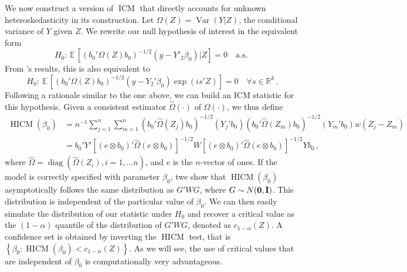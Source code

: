 \documentclass[12pt]{article}
\newcommand{\E}{\operatorname{E}}
\newcommand{\1}{\mathbf{1}}
\newcommand{\HICM}{\operatorname{HICM}}
\newcommand{\Var}{\operatorname{Var}}
\def\E{\mathbb{E}\,}
\newcommand{\ICM}{\operatorname{ICM}}
\DeclareMathOperator{\diag}{diag}
\newcommand{\mI}{\mbox{\bf I}}
\newcommand{\mO}{\mbox{\bf 0}}
\begin{document}
We now construct a version of $\ICM$ that directly accounts for unknown
heteroskedasticity in its construction. Let  $\Omega(Z) = \Var(Y|Z)$,
the conditional variance of $Y$ given $Z$. We rewrite our null
hypothesis of interest in the equivalent form
\begin{equation}
{H}_0: \,  \E\left[ (b_0' \Omega(Z) b_0)^{-1/2}  (y - Y'_{2}\beta_{0}) |Z \right] = 0
\quad \mbox{a.s. }
\label{hyp-hicm}
\end{equation}
From \cite{Bierens82}'s results, this is also equivalent to
\begin{equation}
{H}_{0}: \
\E \left[ (b_0' \Omega(Z) b_0)^{-1/2} \left( y - Y_{2}'\beta_0 \right)
\exp( i s'Z) \right] = 0  \quad \forall s\in\mathbb{R}^k
\, .
\label{icmexp2}
\end{equation}
Following a rationale similar to the one above, we can build an ICM
statistic for this hypothesis.
Given a consistent estimator $\widehat{\Omega}(\cdot)$ of $\Omega(\cdot)$,
we thus define
\begin{align}
\HICM (\beta_{0}) & =
n^{-1}  \sum_{j=1}^{n} \sum_{m=1}^{n} {
(b_0' \widehat{\Omega}(Z_j) b_0)^{-1/2} (Y_j' b_0)
(b_0' \widehat{\Omega}(Z_m) b_0)^{-1/2} (Y_m' b_0)
w(Z_j - Z_m) }
\nonumber \\
&  = b_{0}' Y'
\left[ (e \otimes b_0 )'  \widehat{\Omega}  (e \otimes b_0 ) \right]^{-1/2}   W
\left[ (e \otimes b_0 )'  \widehat{\Omega}  (e \otimes b_0 ) \right]^{-1/2}
Y b_{0}
\label{eq:HICM}
\, ,
\end{align}
where $\widehat{\Omega} = \diag\left( \widehat{\Omega}(Z_i), i = 1,
\ldots n\right) $, and $e$ is the $n$-vector of ones.
If the model is correctly specified with parameter $\beta_0$, twe show that $\HICM(\beta_0)$ asymptotically follows the same
distribution as $G' W G$, where $G\sim N (\mO, \mI)$. This
distribution is independent of the particular value of $\beta_0$. We
can then easily simulate the distribution of our statistic under $H_{0}$ and
recover a critical value as the $(1-\alpha)$ quantile of the
distribution of $G' W G$, denoted as $c_{1-\alpha}(Z)$.
A confidence set is obtained by inverting the $\HICM$ test, that is $\left\{ \beta_{0} :
\HICM(\beta_{0}) < c_{1-\alpha}(Z) \right\}$. As we will see,  the
use of critical values that are independent of $\beta_0$ is
computationally very advantageous.
\end{document}
